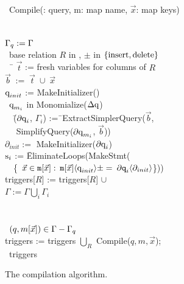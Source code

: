 \begin{figure}
\begin{tabbing}
\alg\ Compile(\q: query, m: map name, $\vec{x}$: map keys) \\
\\
 \\
$\Gamma_{q} := \Gamma$\\
\algforeach\ base relation $R$ in \q,
               $\pm$ in $\{\mbox{insert},\mbox{delete}\}$
\algdo \\
~~\= $\vec{t}$ := fresh variables for columns of $R$
     \\
  \> $\vec{b} \; := \; \vec{t} \; \cup \; \vec{x}$
     $\qquad \qquad \qquad \qquad \qquad$ \\
  \> $\mbox{q}_{init}$ := MakeInitializer(\q)\\
  \> \algforeach\ $\mbox{q}_{m_i}$ in Monomialize($\Delta\mbox{q}$) \algdo\\
\>~~\= ($\partial\mbox{q}_i$, $\Gamma_i$) :=\=\ ExtractSimplerQuery($\vec{b}$,\\
  \>\>\> ~~ SimplifyQuery($\partial\mbox{q}_{m_i}$, $\vec{b}$))\\
  \>\> $\partial_{init} := $ MakeInitializer($\partial\mbox{q} _i$)\\
  \>\> $\mbox{s}_i$ := \= EliminateLoops(MakeStmt(\\
  \>\>\> ~~\{\codeforeach\ $\vec{x} \in \codev{m} [\vec{x}]:$
  $\codev{m} [\vec{x}]\tuple{\v{\q}_{init}} \pm = $
  $\partial\codev{q} _{i}\tuple{\partial_{init}}$\}))\\
  \>\> triggers[$R$] := triggers[$R$] $\cup$ \\
  \>\> $\Gamma := \Gamma \bigcup_i \Gamma_i$
  \ \ \ \ \\
  \>\algdone\\
\algdone\\
\algforeach\ $(q, m[\vec{x}]) \in \Gamma - \Gamma_{q}$ \algdo\\
  \> triggers := triggers $\bigcup_{R}$ Compile($q, m, \vec{x}$); \\
\comment{\algdone\\}
\algreturn\ triggers
\end{tabbing}

\caption{The compilation algorithm.}
\label{fig:compilation-algo}
\end{figure}

